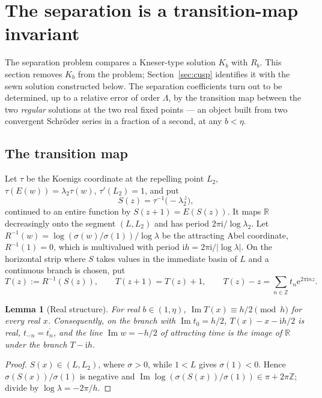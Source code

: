 \documentclass[11pt]{amsart}
\newtheorem{lemma}[theorem]{Lemma}
\theoremstyle{definition}
\newcommand{\Rr}{R}
\newcommand{\Kk}{K}
\newcommand{\eee}{\mathrm{e}}
\newcommand{\ii}{\mathrm{i}}
\begin{document}
\section{The separation is a transition-map invariant}\label{sec:transition}

The separation problem compares a Kneser-type solution $\Kk_b$ with $\Rr_b$.
This section removes $\Kk_b$ from the problem; Section~\ref{sec:cusp}
identifies it with the sewn solution constructed below.  The separation coefficients turn out to be determined, up to a
relative error of order $\Lambda$, by the transition map between the two
\emph{regular} solutions at the two real fixed points --- an object built from
two convergent Schr\"oder series in a fraction of a second, at any $b<\eta$.

\subsection{The transition map}
Let $\tau$ be the Koenigs coordinate at the repelling point $L_2$,
$\tau(E(w))=\lambda_2\tau(w)$, $\tau'(L_2)=1$, and put
\[
 S(z)=\tau^{-1}\bigl(-\lambda_2^{\,z}\bigr),
\]
continued to an entire function by $S(z+1)=E(S(z))$.  It maps $\mathbb R$
decreasingly onto the segment $(L,L_2)$ and has period $2\pi\ii/\log\lambda_2$.
Let $\Rr^{-1}(w)=\log(\sigma(w)/\sigma(1))/\log\lambda$ be the attracting Abel
coordinate, $\Rr^{-1}(1)=0$, which is multivalued with period
$\ii h=2\pi\ii/|\log\lambda|$.  On the horizontal strip where $S$ takes values
in the immediate basin of $L$ and a continuous branch is chosen, put
\[
 T(z):=\Rr^{-1}(S(z)),\qquad T(z+1)=T(z)+1,\qquad
 T(z)-z=\sum_{n\in\mathbb Z}t_n\eee^{2\pi\ii nz}.
\]

\begin{lemma}[Real structure]\label{lem:realT}
For real $b\in(1,\eta)$, $\operatorname{Im}T(x)\equiv h/2\pmod h$ for every
real $x$.  Consequently, on the branch with $\operatorname{Im}t_0=h/2$,
$T(x)-x-\ii h/2$ is real, $t_{-n}=\overline{t_n}$, and the line
$\operatorname{Im}w=-h/2$ of attracting time is the image of $\mathbb R$ under
the branch $T-\ii h$.
\end{lemma}

\begin{proof}
$S(x)\in(L,L_2)$, where $\sigma>0$, while $1<L$ gives $\sigma(1)<0$.  Hence
$\sigma(S(x))/\sigma(1)$ is negative and
$\operatorname{Im}\log(\sigma(S(x))/\sigma(1))\in\pi+2\pi\mathbb Z$; divide
by $\log\lambda=-2\pi/h$.
\end{proof}
\end{document}
